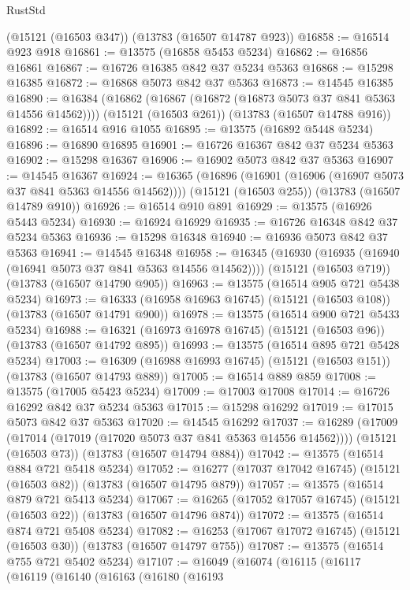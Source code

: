 \begin{lexlean}{RustStd}
\begin{coremodule}
    (@15121 (@16503 @347))
    (@13783 (@16507 @14787 @923))
@16858 := @16514 @923 @918
@16861 := @13575 (@16858 @5453 @5234)
@16862 := @16856 @16861
@16867 := @16726 @16385 @842 @37 @5234 @5363
@16868 := @15298 @16385
@16872 := @16868 @5073 @842 @37 @5363
@16873 := @14545 @16385
@16890 := @16384
    (@16862 (@16867 (@16872 (@16873 @5073 @37 @841 @5363 @14556 @14562))))
    (@15121 (@16503 @261))
    (@13783 (@16507 @14788 @916))
@16892 := @16514 @916 @1055
@16895 := @13575 (@16892 @5448 @5234)
@16896 := @16890 @16895
@16901 := @16726 @16367 @842 @37 @5234 @5363
@16902 := @15298 @16367
@16906 := @16902 @5073 @842 @37 @5363
@16907 := @14545 @16367
@16924 := @16365
    (@16896 (@16901 (@16906 (@16907 @5073 @37 @841 @5363 @14556 @14562))))
    (@15121 (@16503 @255))
    (@13783 (@16507 @14789 @910))
@16926 := @16514 @910 @891
@16929 := @13575 (@16926 @5443 @5234)
@16930 := @16924 @16929
@16935 := @16726 @16348 @842 @37 @5234 @5363
@16936 := @15298 @16348
@16940 := @16936 @5073 @842 @37 @5363
@16941 := @14545 @16348
@16958 := @16345
    (@16930 (@16935 (@16940 (@16941 @5073 @37 @841 @5363 @14556 @14562))))
    (@15121 (@16503 @719))
    (@13783 (@16507 @14790 @905))
@16963 := @13575 (@16514 @905 @721 @5438 @5234)
@16973 := @16333 (@16958 @16963 @16745) (@15121 (@16503 @108)) (@13783 (@16507 @14791 @900))
@16978 := @13575 (@16514 @900 @721 @5433 @5234)
@16988 := @16321 (@16973 @16978 @16745) (@15121 (@16503 @96)) (@13783 (@16507 @14792 @895))
@16993 := @13575 (@16514 @895 @721 @5428 @5234)
@17003 := @16309 (@16988 @16993 @16745) (@15121 (@16503 @151)) (@13783 (@16507 @14793 @889))
@17005 := @16514 @889 @859
@17008 := @13575 (@17005 @5423 @5234)
@17009 := @17003 @17008
@17014 := @16726 @16292 @842 @37 @5234 @5363
@17015 := @15298 @16292
@17019 := @17015 @5073 @842 @37 @5363
@17020 := @14545 @16292
@17037 := @16289
    (@17009 (@17014 (@17019 (@17020 @5073 @37 @841 @5363 @14556 @14562))))
    (@15121 (@16503 @73))
    (@13783 (@16507 @14794 @884))
@17042 := @13575 (@16514 @884 @721 @5418 @5234)
@17052 := @16277 (@17037 @17042 @16745) (@15121 (@16503 @82)) (@13783 (@16507 @14795 @879))
@17057 := @13575 (@16514 @879 @721 @5413 @5234)
@17067 := @16265 (@17052 @17057 @16745) (@15121 (@16503 @22)) (@13783 (@16507 @14796 @874))
@17072 := @13575 (@16514 @874 @721 @5408 @5234)
@17082 := @16253 (@17067 @17072 @16745) (@15121 (@16503 @30)) (@13783 (@16507 @14797 @755))
@17087 := @13575 (@16514 @755 @721 @5402 @5234)
@17107 := @16049
    (@16074
      (@16115
        (@16117
          (@16119
            (@16140
              (@16163
                (@16180
                  (@16193

\end{coremodule}
\end{lexlean}
